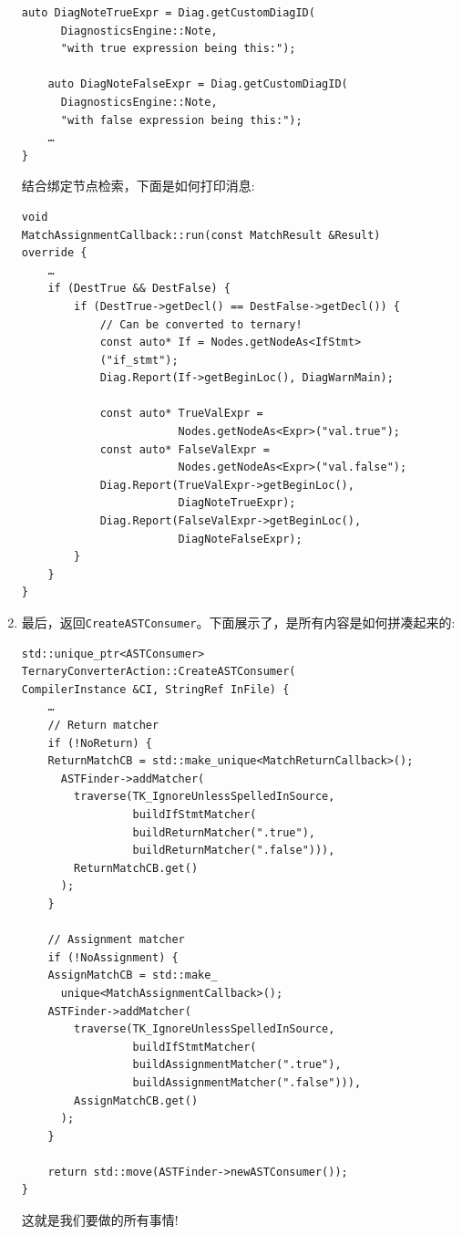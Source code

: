 \begin{enumerate}
\begin{lstlisting}[style=styleCXX]
	auto DiagNoteTrueExpr = Diag.getCustomDiagID(
	  DiagnosticsEngine::Note,
	  "with true expression being this:");
	  
	auto DiagNoteFalseExpr = Diag.getCustomDiagID(
	  DiagnosticsEngine::Note,
	  "with false expression being this:");
	…
}
\end{lstlisting}

结合绑定节点检索，下面是如何打印消息:

\begin{lstlisting}[style=styleCXX]
void
MatchAssignmentCallback::run(const MatchResult &Result)
override {
	…
	if (DestTrue && DestFalse) {
		if (DestTrue->getDecl() == DestFalse->getDecl()) {
			// Can be converted to ternary!
			const auto* If = Nodes.getNodeAs<IfStmt>
			("if_stmt");
			Diag.Report(If->getBeginLoc(), DiagWarnMain);
			
			const auto* TrueValExpr =
			            Nodes.getNodeAs<Expr>("val.true");
			const auto* FalseValExpr =
			            Nodes.getNodeAs<Expr>("val.false");
			Diag.Report(TrueValExpr->getBeginLoc(),
			            DiagNoteTrueExpr);
			Diag.Report(FalseValExpr->getBeginLoc(),
			            DiagNoteFalseExpr);
		}
	}
}
\end{lstlisting}

\item 最后，返回\texttt{CreateASTConsumer}。下面展示了，是所有内容是如何拼凑起来的:

\begin{lstlisting}[style=styleCXX]
std::unique_ptr<ASTConsumer>
TernaryConverterAction::CreateASTConsumer(
CompilerInstance &CI, StringRef InFile) {
	…
	// Return matcher
	if (!NoReturn) {
	ReturnMatchCB = std::make_unique<MatchReturnCallback>();
      ASTFinder->addMatcher(
	    traverse(TK_IgnoreUnlessSpelledInSource,
	             buildIfStmtMatcher(
	             buildReturnMatcher(".true"),
	             buildReturnMatcher(".false"))),
	    ReturnMatchCB.get()
	  );
 	}

	// Assignment matcher
	if (!NoAssignment) {
	AssignMatchCB = std::make_
	  unique<MatchAssignmentCallback>();
	ASTFinder->addMatcher(
	    traverse(TK_IgnoreUnlessSpelledInSource,
	             buildIfStmtMatcher(
	             buildAssignmentMatcher(".true"),
	             buildAssignmentMatcher(".false"))),
	    AssignMatchCB.get()
	  );
	}

	return std::move(ASTFinder->newASTConsumer());
}
\end{lstlisting}

这就是我们要做的所有事情!


\end{enumerate}

